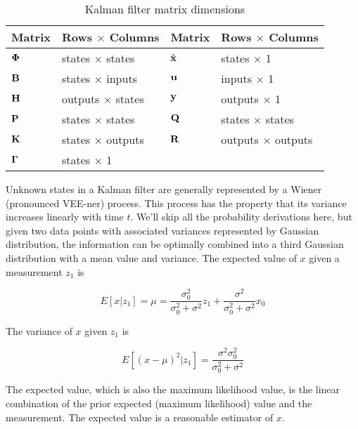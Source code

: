 \begin{table}[ht]
  \renewcommand{\arraystretch}{1.5}
  \centering
  \begin{tabular}{|ll|ll|}
    \hline
    \rowcolor{headingbg}
    \textbf{Matrix} & \textbf{Rows $\times$ Columns} &
    \textbf{Matrix} & \textbf{Rows $\times$ Columns} \\
    \hline
    $\mathbf{\Phi}$ & states $\times$ states & $\hat{\mathbf{x}}$ & states $\times$ 1
      \\
    $\mathbf{B}$ & states $\times$ inputs & $\mathbf{u}$ & inputs $\times$ 1 \\
    $\mathbf{H}$ & outputs $\times$ states & $\mathbf{y}$ & outputs $\times$ 1 \\
    $\mathbf{P}$ & states $\times$ states & $\mathbf{Q}$ & states $\times$ states \\
    $\mathbf{K}$ & states $\times$ outputs & $\mathbf{R}$ & outputs $\times$ outputs
      \\
    $\mathbf{\Gamma}$ & states $\times$ 1 &  &  \\
    \hline
  \end{tabular}
  \caption{Kalman filter matrix dimensions}
  \label{tab:kf_matrix_dims}
\end{table}

Unknown states in a Kalman filter are generally represented by a Wiener
(pronounced VEE-ner) process. This process has the property that its variance
increases linearly with time $t$. We'll skip all the probability derivations
here, but given two data points with associated variances represented by
Gaussian distribution, the information can be optimally combined into a third
Gaussian distribution with a mean value and variance. The expected value of $x$
given a measurement $z_1$ is

\begin{equation}
  E[x|z_1] = \mu = \frac{\sigma_0^2}{\sigma_0^2 + \sigma^2}z_1 +
    \frac{\sigma^2}{\sigma_0^2 + \sigma^2}x_0
\end{equation}

The variance of $x$ given $z_1$ is

\begin{equation}
  E[(x - \mu)^2|z_1] = \frac{\sigma^2 \sigma_0^2}{\sigma_0^2 + \sigma^2}
\end{equation}

The expected value, which is also the maximum likelihood value, is the linear
combination of the prior expected (maximum likelihood) value and the
measurement. The expected value is a reasonable estimator of $x$.

